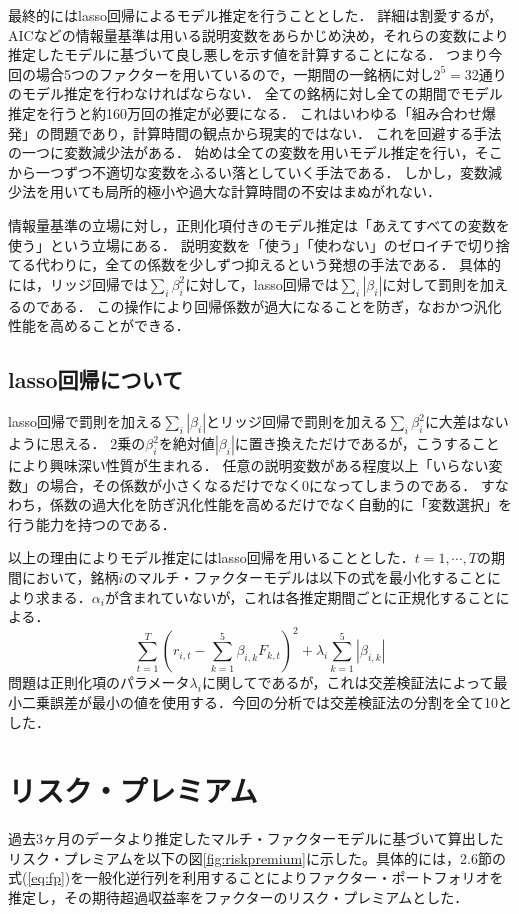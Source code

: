 \documentclass[11pt]{jreport}
\begin{document}
最終的にはlasso回帰によるモデル推定を行うこととした．
詳細は割愛するが，AICなどの情報量基準は用いる説明変数をあらかじめ決め，それらの変数により推定したモデルに基づいて良し悪しを示す値を計算することになる．
つまり今回の場合5つのファクターを用いているので，一期間の一銘柄に対し$2^5 = 32$通りのモデル推定を行わなければならない．
全ての銘柄に対し全ての期間でモデル推定を行うと約160万回の推定が必要になる．
これはいわゆる「組み合わせ爆発」の問題であり，計算時間の観点から現実的ではない．
これを回避する手法の一つに変数減少法がある．
始めは全ての変数を用いモデル推定を行い，そこから一つずつ不適切な変数をふるい落としていく手法である．
しかし，変数減少法を用いても局所的極小や過大な計算時間の不安はまぬがれない．

情報量基準の立場に対し，正則化項付きのモデル推定は「あえてすべての変数を使う」という立場にある．
説明変数を「使う」「使わない」のゼロイチで切り捨てる代わりに，全ての係数を少しずつ抑えるという発想の手法である．
具体的には，リッジ回帰では$\sum_i\beta_i^2$に対して，lasso回帰では$\sum_i | \beta_i |$に対して罰則を加えるのである．
この操作により回帰係数が過大になることを防ぎ，なおかつ汎化性能を高めることができる．


\subsection{lasso回帰について}
lasso回帰で罰則を加える$\sum_i | \beta_i |$とリッジ回帰で罰則を加える$\sum_i\beta_i^2$に大差はないように思える．
2乗の$\beta_i^2$を絶対値$|\beta_i|$に置き換えただけであるが，こうすることにより興味深い性質が生まれる．
任意の説明変数がある程度以上「いらない変数」の場合，その係数が小さくなるだけでなく$0$になってしまうのである．
すなわち，係数の過大化を防ぎ汎化性能を高めるだけでなく自動的に「変数選択」を行う能力を持つのである．

以上の理由によりモデル推定にはlasso回帰を用いることとした．$t=1,\cdots,T$の期間において，銘柄$i$のマルチ・ファクターモデルは以下の式を最小化することにより求まる．$\alpha_i$が含まれていないが，これは各推定期間ごとに正規化することによる．
\begin{equation}
\sum_{t=1}^T\left(r_{i,t} - \sum_{k=1}^5\beta_{i,k}F_{k,t} \right)^2 + \lambda_i\sum_{k=1}^5|\beta_{i,k}|
\end{equation}
問題は正則化項のパラメータ$\lambda_i$に関してであるが，これは交差検証法によって最小二乗誤差が最小の値を使用する．今回の分析では交差検証法の分割を全て10とした．


\section{リスク・プレミアム}
過去3ヶ月のデータより推定したマルチ・ファクターモデルに基づいて算出したリスク・プレミアムを以下の図\ref{fig:riskpremium}に示した。具体的には，2.6節の式(\ref{eq:fp})を一般化逆行列を利用することによりファクター・ポートフォリオを推定し，その期待超過収益率をファクターのリスク・プレミアムとした．
\end{document}
